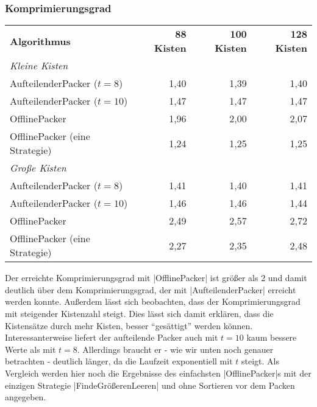 \subsubsection*{Komprimierungsgrad}
\begin{center}
\begin{tabular}{lrrr}
\vspace*{.42em}
\textbf{Algorithmus} 	& \textbf{88 Kisten} 	& \textbf{100 Kisten} 	& \textbf{128 Kisten} 	\\
\textit{Kleine Kisten} & & & \\
 AufteilenderPacker ($t=8$)  	& 1,40		& 1,39			& 1,40			\\
 AufteilenderPacker ($t=10$)	& 1,47		& 1,47			& 1,47			\\
 OfflinePacker			& 1,96		& 2,00			& 2,07			\\
\vspace*{.42em}
 OfflinePacker (eine Strategie)	& 1,24		& 1,25			& 1,25			\\
\textit{Große Kisten} & & & \\
 AufteilenderPacker ($t=8$)  	& 1,41		& 1,40			& 1,41			\\
 AufteilenderPacker ($t=10$)	& 1,46		& 1,46			& 1,44			\\
 OfflinePacker			& 2,49		& 2,57			& 2,72			\\
 OfflinePacker (eine Strategie)	& 2,27		& 2,35			& 2,48			\\
\end{tabular}
\end{center}
 Der erreichte Komprimierungsgrad mit |OfflinePacker| ist größer als 2 und damit deutlich über dem Komprimierungsgrad, der mit |AufteilenderPacker|
  erreicht werden konnte. Außerdem lässt sich beobachten, dass der Komprimierungsgrad mit steigender Kistenzahl steigt.
 Dies lässt sich damit erklären, dass die Kistensätze durch mehr Kisten, besser ``gesättigt'' werden können. 
 Interessanterweise liefert der aufteilende Packer auch mit $t=10$ kaum bessere Werte als mit $t=8$.
 Allerdings braucht er - wie wir unten noch genauer betrachten - deutlich länger, da die Laufzeit exponentiell mit $t$ steigt.
 Als Vergleich werden hier noch die Ergebnisse des einfachsten |OfflinePacker|s mit der einzigen Strategie |FindeGrößerenLeeren| und ohne Sortieren vor dem Packen angegeben.

